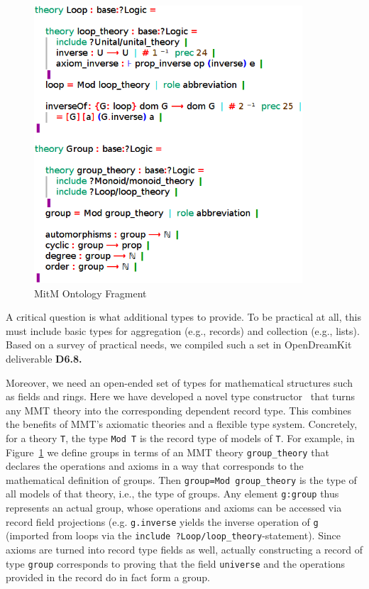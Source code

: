 \begin{figure}[ht]\centering
  \includegraphics[width=10cm]{../D6.8/groups}
  \caption{MitM Ontology Fragment}\label{fig:mitm1}
\end{figure}

A critical question is what additional types to provide.
To be practical at all, this must include basic types for aggregation (e.g., records) and collection (e.g., lists).
Based on a survey of practical needs, we compiled such a set in OpenDreamKit deliverable \textbf{D6.8.}~\cite{ODK-D6.8,}

Moreover, we need an open-ended set of types for mathematical structures such as fields and rings.
Here we have developed a novel type constructor~\cite{MueRabKoh:tat18} that turns any MMT theory into the corresponding dependent record type.
This combines the benefits of MMT's axiomatic theories and a flexible type system.
Concretely, for a theory \lstinline|T|, the type \lstinline|Mod T| is the record type of models of \lstinline|T|.
For example, in Figure~\ref{fig:mitm1} we define groups in terms of an MMT theory \lstinline|group_theory| that declares the operations and axioms in a way that corresponds to the mathematical definition of groups.
Then \lstinline|group=Mod group_theory| is the type of all models of that theory, i.e., the type of groups.
Any element \lstinline|g:group| thus represents an actual group, whose operations and axioms can be accessed via record field projections (e.g. \lstinline|g.inverse| yields the inverse operation of \lstinline|g| (imported from loops via the \lstinline|include ?Loop/loop_theory|-statement).
Since axioms are turned into record type fields as well, actually constructing a record of type \lstinline|group| corresponds to proving that the field \lstinline|universe| and the operations provided in the record do in fact form a group.

